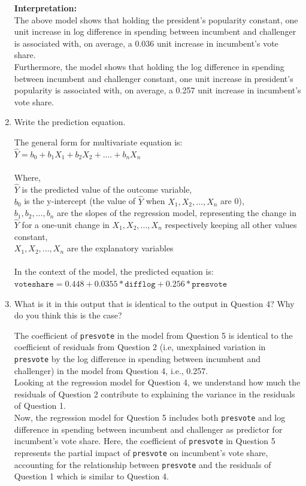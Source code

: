 \documentclass[12pt,letterpaper]{article}
\begin{document}
\begin{enumerate}
		\pagebreak
		
		\textbf{Interpretation:}\\
		The above model shows that holding the president's popularity constant, one unit increase in log difference in spending between incumbent and challenger is associated with, on average, a 0.036 unit increase in incumbent's vote share.\\
		Furthermore, the model shows that holding the log difference in spending between incumbent and challenger constant, one unit increase in president's popularity is associated with, on average, a 0.257 unit increase in incumbent's vote share.
				
		\item Write the prediction equation.
		
		\noindent The general form for multivariate equation is:
		$\hat{Y} = b_0 + b_1 X_1 + b_2 X_2 + .... + b_n X_n$\\
		\\Where,\\
		$\hat{Y}$ is the predicted value of the outcome variable,\\
		$b_0$ is the y-intercept (the value of $\hat{Y}$ when $X_1, X_2, ..., X_n$ are 0),\\
		$b_1, b_2, ..., b_n$ are the slopes of the regression model, representing the change in $\hat{Y}$ for a one-unit change in $X_1, X_2, ..., X_n$ respectively keeping all other values constant,\\
		$X_1, X_2, ..., X_n$ are the explanatory variables\\
		\\
		In the context of the model, the predicted equation is:\\
		\textit{$\texttt{voteshare} = 0.448 + 0.0355*\texttt{difflog} + 0.256*\texttt{presvote}$}
		
		\item What is it in this output that is identical to the output in Question 4? Why do you think this is the case?
		
		The coefficient of \texttt{presvote} in the model from Question 5 is identical to the coefficient of residuals from Question 2 (i.e, unexplained variation in \texttt{presvote} by the log difference in spending between incumbent and challenger) in the model from Question 4, i.e., 0.257.\\
		
		
		Looking at the regression model for Question 4, we understand how much the residuals of Question 2 contribute to explaining the variance in the residuals of Question 1.\\
		Now, the regression model for Question 5 includes both \texttt{presvote} and log difference in spending between incumbent and challenger as predictor for incumbent's vote share.
		Here, the coefficient of \texttt{presvote} in Question 5 represents the partial impact of \texttt{presvote} on incumbent's vote share, accounting for the relationship between \texttt{presvote} and the residuals of Question 1 which is similar to Question 4.
		
		
		
	\end{enumerate}
\end{document}
